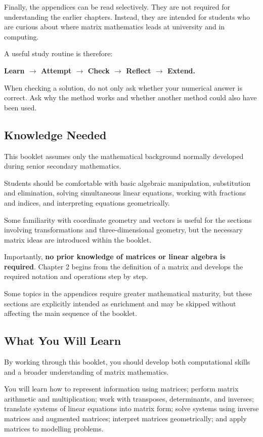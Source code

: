 \documentclass[12pt]{article}
\begin{document}
Finally, the appendices can be read selectively. They are not required for understanding the earlier chapters. Instead, they are intended for students who are curious about where matrix mathematics leads at university and in computing.

A useful study routine is therefore:

\textbf{Learn $\rightarrow$ Attempt $\rightarrow$ Check $\rightarrow$ Reflect $\rightarrow$ Extend.}

When checking a solution, do not only ask whether your numerical answer is correct. Ask why the method works and whether another method could also have been used.

\subsection{Knowledge Needed}

This booklet assumes only the mathematical background normally developed during senior secondary mathematics.

Students should be comfortable with basic algebraic manipulation, substitution and elimination, solving simultaneous linear equations, working with fractions and indices, and interpreting equations geometrically.

Some familiarity with coordinate geometry and vectors is useful for the sections involving transformations and three-dimensional geometry, but the necessary matrix ideas are introduced within the booklet.

Importantly, \textbf{no prior knowledge of matrices or linear algebra is required}. Chapter 2 begins from the definition of a matrix and develops the required notation and operations step by step.

Some topics in the appendices require greater mathematical maturity, but these sections are explicitly intended as enrichment and may be skipped without affecting the main sequence of the booklet.

\subsection{What You Will Learn}

By working through this booklet, you should develop both computational skills and a broader understanding of matrix mathematics.

You will learn how to represent information using matrices; perform matrix arithmetic and multiplication; work with transposes, determinants, and inverses; translate systems of linear equations into matrix form; solve systems using inverse matrices and augmented matrices; interpret matrices geometrically; and apply matrices to modelling problems.
\end{document}
